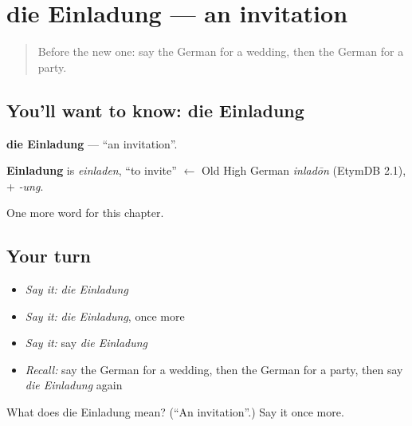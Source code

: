 \section[die Einladung]{die Einladung — an invitation}

\label{lesson:GE-C163-einladung}



\begin{quote}
Before the new one: say the German for a wedding, then the German for a party.
\end{quote}

\subsection*{You'll want to know: die Einladung}
\textbf{die Einladung} — \textquotedblleft{}an invitation\textquotedblright{}.

\begin{cousinweb}
\textbf{Einladung} is \emph{einladen}, \textquotedblleft{}to invite\textquotedblright{} $\leftarrow$ Old High German \emph{inladōn} (EtymDB 2.1), + \emph{-ung}.
\end{cousinweb}

\begin{grammarlens}[title={What you've built}]
One more word for this chapter.
\end{grammarlens}

\subsection*{Your turn}
\begin{itemize}
\raggedright
  \item \emph{Say it:} \emph{die Einladung}
  \item \emph{Say it:} \emph{die Einladung}, once more
  \item \emph{Say it:} say \emph{die Einladung}
  \item \emph{Recall:} say the German for a wedding, then the German for a party, then say \emph{die Einladung} again
\end{itemize}

\begin{tcolorbox}[breakable,colback=teal!4,colframe=teal!35!black,title={Before you move on}]
What does die Einladung mean? (\textquotedblleft{}An invitation\textquotedblright{}.) Say it once more.
\end{tcolorbox}
